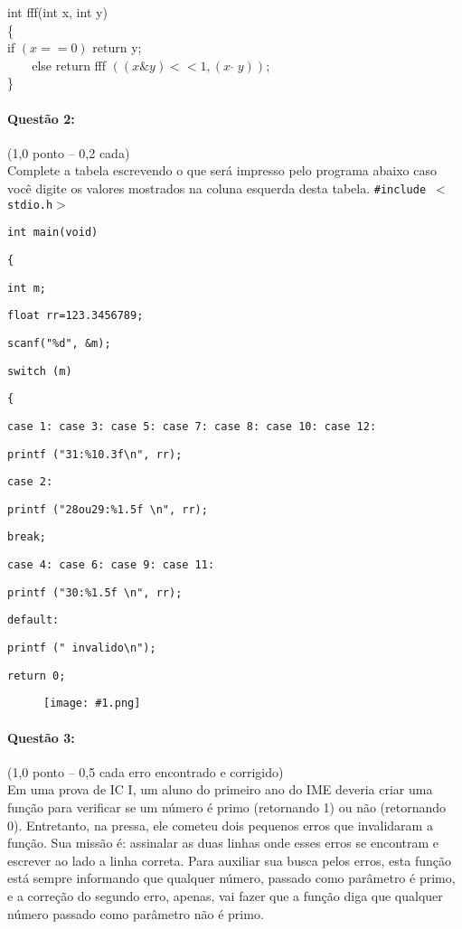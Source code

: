 \documentclass[12pt,a4paper]{article}
\newcommand{\imgh}[2]{\begin{figure}[h]
\centering
\texttt{[image: \#1.png]}
\end{figure}}
\begin{document}
int fff(int x, int y)\\
\{\\
if $(x==0)$ return y;\\
$\;\;\;\;\;\;\;$else return fff $( (x\&y)<<1, (x\;\hat{}\;y) )$;\\
\}

\paragraph{Questão 2:}(1,0 ponto – 0,2 cada)\\
Complete a tabela escrevendo o que será impresso pelo programa abaixo caso você digite os valores mostrados na coluna esquerda desta tabela.
\texttt{\#include\,$<$stdio.h$>$}

\texttt{int main(void)}

\texttt{\{}

\texttt{\qquad int m;}

\texttt{\qquad float rr=123.3456789;}

\texttt{\qquad scanf("\%d", \&m);}

\texttt{\qquad switch (m)}

\texttt{\qquad \{}
      
\texttt{\qquad \qquad case 1: case 3: case 5: case 7: case 8: case 10: case 12:}

\texttt{\qquad \qquad \qquad printf ("31:\%10.3f\textbackslash n", rr);}

\texttt{\qquad \qquad case 2:}

\texttt{\qquad \qquad \qquad printf ("28ou29:\%1.5f \textbackslash n", rr);}

\texttt{\qquad \qquad \qquad break;}

\texttt{\qquad \qquad case 4: case 6: case 9: case 11:}

\texttt{\qquad \qquad \qquad printf ("30:\%1.5f \textbackslash n", rr);}

\texttt{\qquad \qquad default:}

\texttt{\qquad \qquad \qquad printf (" invalido\textbackslash n");}

\texttt{\qquad return 0;}

\imgh{icvf2009q2}{14}


\paragraph{Questão 3:}(1,0 ponto – 0,5 cada erro encontrado e corrigido)\\
Em uma prova de IC I, um aluno do primeiro ano do IME deveria criar uma função para verificar se um número é primo (retornando 1) ou não (retornando 0). Entretanto, na pressa, ele cometeu dois pequenos erros que invalidaram a função. Sua missão é: assinalar as duas linhas onde esses erros se encontram e escrever ao lado a linha correta. Para auxiliar sua busca pelos erros, esta função está sempre informando que qualquer número, passado como parâmetro é primo, e a correção do segundo erro, apenas, vai fazer que a função diga que qualquer número passado como parâmetro não é primo.\\
\end{document}
